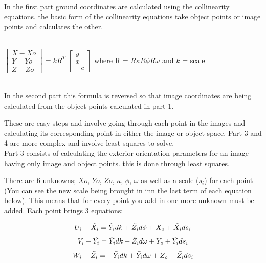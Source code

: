 \documentclass[11pt,a4paper]{article}
\begin{document}
	In the first part ground coordinates are calculated using the collinearity equations. the basic form of the collinearity equations take object points or image points and calculates the other.\\
	\\
	
	
	\centerline{
	$
	\begin{bmatrix}
		X - Xo \\ 
		Y - Yo \\ 
		Z - Zo
	\end{bmatrix}= kR^T$
	$
	\begin{bmatrix}
		y \\ 
		x \\ 
		-c
	\end{bmatrix}
	$
	where R = $R\kappa R\phi R\omega$ and $k$ = scale\\}
	~\\
	
	In the second part this formula is reversed so that image coordinates are being calculated from the object points calculated in part 1.
	
	These are easy steps and involve going through each point in the images and calculating its corresponding point in either the image or object space. Part 3 and 4 are more complex and involve least squares to solve.\\
	
	Part 3 consists of calculating the exterior orientation parameters for an image having only image and object points. this is done through least squares. 
	
	There are 6 unknowns; $Xo$, $Yo$, $Zo$, $\kappa$, $\phi$, $\omega$ as well as a scale ($s_i$) for each point (You can see the new scale being brought in inn the last term of each equation below). This means that for every point you add in one more unknown must be added. Each point brings 3 equations:
	
	\begin{equation}\notag
	U_i - \tilde{X_i} = \tilde{Y_i} dk + \tilde{Z_i}d\phi + X_o + \tilde{X_i}ds_i
	\end{equation}
	\begin{equation}\notag
	V_i - \tilde{Y_i} = \tilde{Y_i} dk - \tilde{Z_i}d\omega + Y_o + \tilde{Y_i}ds_i
	\end{equation}
	\begin{equation}\notag
	W_i - \tilde{Z_i} = -\tilde{Y_i} dk + \tilde{Y_i}d\omega + Z_o + \tilde{Z_i}ds_i
	\end{equation}
	
\end{document}
